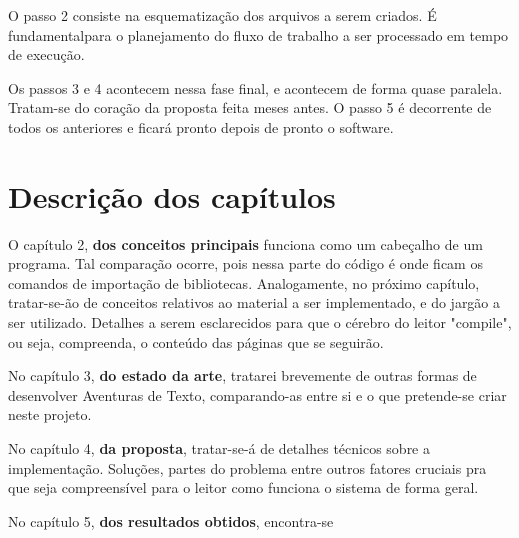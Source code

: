 O passo 2 consiste na esquematização dos arquivos a serem criados. É fundamentalpara o planejamento do fluxo de
trabalho a ser processado em tempo de execução.

Os passos 3 e 4 acontecem nessa fase final, e acontecem de forma quase paralela. Tratam-se do coração da proposta feita
meses antes. O passo 5 é decorrente de todos os anteriores e ficará pronto depois de pronto o software.

\section{Descrição dos capítulos}
\label{sec:description}

O capítulo 2, \textbf{dos conceitos principais} funciona como um cabeçalho de um programa. Tal comparação ocorre,
pois nessa parte do código é onde ficam os comandos de importação de bibliotecas. Analogamente, no próximo capítulo,
tratar-se-ão de conceitos relativos ao material a ser implementado, e do jargão a ser utilizado. Detalhes a serem
esclarecidos para que o cérebro do leitor "compile", ou seja, compreenda, o conteúdo das páginas que se seguirão.

No capítulo 3, \textbf{do estado da arte}, tratarei brevemente de outras formas de desenvolver Aventuras de Texto,
comparando-as entre si e o que pretende-se criar neste projeto.

No capítulo 4, \textbf{da proposta}, tratar-se-á de detalhes técnicos sobre a implementação. Soluções, partes do
problema entre outros fatores cruciais pra que seja compreensível para o leitor como funciona o sistema de forma geral.

No capítulo 5, \textbf{dos resultados obtidos}, encontra-se
